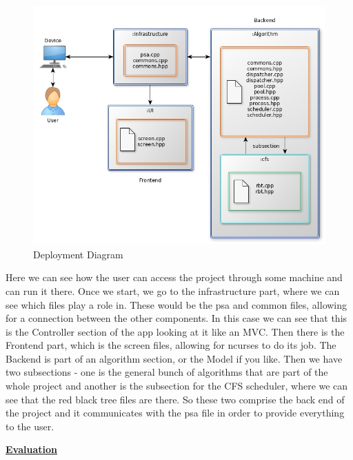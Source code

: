 \documentclass{article}
\begin{document}
\begin{figure}[H]
  \centering
  \includegraphics[width=\linewidth]{./pics/deployment.jpg}
  \caption{Deployment Diagram}
  \label{fig:Deployment Diagram}
\end{figure}

Here we can see how the user can access the project through some machine and can run it there. Once we start, we go to the infrastructure part, where we can see which files play a role in. These would be the psa and common files, allowing for a connection between the other components. In this case we can see that this is the Controller section of the app looking at it like an MVC. Then there is the Frontend part, which is the screen files, allowing for ncurses to do its job. The Backend is part of an algorithm section, or the Model if you like. Then we have two subsections - one is the general bunch of algorithms that are part of the whole project and another is the subsection for the CFS scheduler, where we can see that the red black tree files are there. So these two comprise the back end of the project and it communicates with the psa file in order to provide everything to the user.

\bigskip

\underline{\textbf{Evaluation}}
\end{document}
